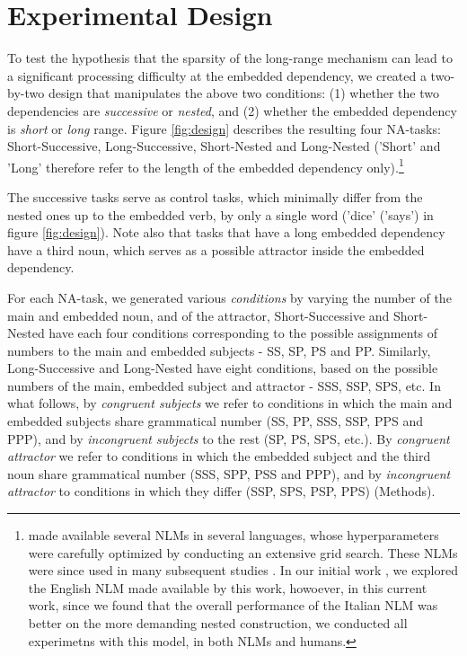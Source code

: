 \section{Experimental Design}
To test the hypothesis that the sparsity of the long-range mechanism can lead to a significant processing difficulty at the embedded dependency, we created a two-by-two design that manipulates the above two conditions: (1) whether the two dependencies are \textit{successive} or \textit{nested}, and (2) whether the embedded dependency is \textit{short} or \textit{long} range. Figure \ref{fig:design} describes the resulting four NA-tasks: Short-Successive, Long-Successive, Short-Nested and Long-Nested ('Short' and 'Long' therefore refer to the length of the embedded dependency only).\footnote{\citet{Gulordava:etal:2018} made available several NLMs in several languages, whose hyperparameters were carefully optimized by conducting an extensive grid search. These NLMs were since used in many subsequent studies \citep{}. In our initial work \citep{lakretz2019emergence}, we explored the English NLM made available by this work, howoever, in this current work, since we found that the overall performance of the Italian NLM was better on the more demanding nested construction, we conducted all experimetns with this model, in both NLMs and humans.} 

The successive tasks serve as control tasks, which minimally differ from the nested ones up to the embedded verb, by only a single word ('dice' ('says') in figure \ref{fig:design}). Note also that tasks that have a long embedded dependency have a third noun, which serves as a possible attractor inside the embedded dependency.

For each NA-task, we generated various \textit{conditions} by varying the number of the main and embedded noun, and of the attractor, Short-Successive and Short-Nested have each four conditions corresponding to the possible assignments of numbers to the main and embedded subjects - SS, SP, PS and PP. Similarly, Long-Successive and Long-Nested have eight conditions, based on the possible numbers of the main, embedded subject and attractor - SSS, SSP, SPS, etc. In what follows, by \textit{congruent subjects} we refer to conditions in which the main and embedded subjects share grammatical number (SS, PP, SSS, SSP, PPS and PPP), and by \textit{incongruent subjects} to the rest (SP, PS, SPS, etc.). By \textit{congruent attractor} we refer to conditions in which the embedded subject and the third noun share grammatical number (SSS, SPP, PSS and PPP), and by \textit{incongruent attractor} to conditions in which they differ (SSP, SPS, PSP, PPS) (Methods). 

